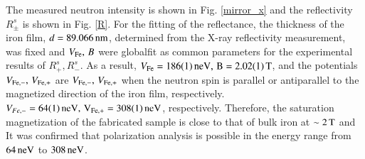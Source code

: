 \documentclass{jps-cp}
\begin{document}
The measured neutron intensity is shown in Fig. \ref{mirror_x} and the reflectivity $R^s_{\pm}$ is shown in Fig. \ref{R}.
For the fitting of the reflectance, the thickness of the iron film, $d=89.066\,\rm nm$, determined from the X-ray reflectivity measurement, was fixed and $V_{\rm Fe},\,B$ were globalfit as common parameters for the experimental results of $R^s_{+},R^s_{-}$. As a result, $V_{\rm Fe}=186(1)\,\rm neV,\,B=2.02(1)\,\rm T$, and the potentials $V_{\rm Fe,-},\,V_{\rm Fe,+}$ are $V_{\rm Fe,-},\,V_{\rm Fe,+}$ when the neutron spin is parallel or antiparallel to the magnetized direction of the iron film, respectively. $V_{Fe,-}=64(1)\,\rm neV,\,V_{\rm Fe,+}=308(1)\,\rm neV$, respectively. Therefore, the saturation magnetization of the fabricated sample is close to that of bulk iron at $\sim 2\,\rm T$ and %
It was confirmed that polarization analysis is possible in the energy range from $64\,\rm neV$ to $308\,\rm neV$.


\end{document}
